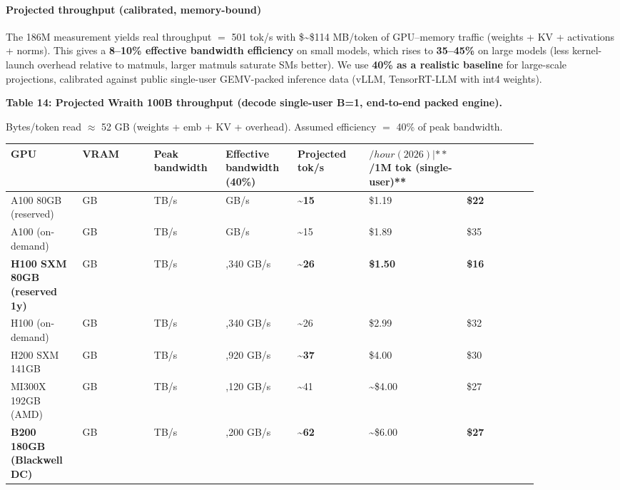 \paragraph{Projected throughput (calibrated,
memory-bound)}\label{projected-throughput-calibrated-memory-bound}

The 186M measurement yields real throughput \(=\) 501 tok/s with
\$\sim\$114 MB/token of GPU--memory traffic (weights + KV + activations
+ norms). This gives a \textbf{8--10\% effective bandwidth efficiency}
on small models, which rises to \textbf{35--45\%} on large models (less
kernel-launch overhead relative to matmuls, larger matmuls saturate SMs
better). We use \textbf{40\% as a realistic baseline} for large-scale
projections, calibrated against public single-user GEMV-packed inference
data (vLLM, TensorRT-LLM with int4 weights).

\textbf{Table 14: Projected Wraith 100B throughput (decode single-user
B=1, end-to-end packed engine).}

Bytes/token read \(\approx\) 52 GB (weights + emb + KV + overhead).
Assumed efficiency \(=\) 40\% of peak bandwidth.

{\def\LTcaptype{none} %
{\footnotesize\setlength{\tabcolsep}{3pt}
\begin{longtable}[]{@{}>{\raggedright\arraybackslash}p{0.123\linewidth}>{\raggedright\arraybackslash}p{0.123\linewidth}>{\raggedright\arraybackslash}p{0.123\linewidth}>{\raggedright\arraybackslash}p{0.123\linewidth}>{\raggedright\arraybackslash}p{0.123\linewidth}>{\raggedright\arraybackslash}p{0.123\linewidth}>{\raggedright\arraybackslash}p{0.123\linewidth}@{}}
\toprule\noalign{}
GPU & VRAM & Peak bandwidth & Effective bandwidth (40\%) & \textbf{Projected tok/s} & \(/hour (2026) | **\)/1M tok (single-user)** &  \\
\midrule\noalign{}
\endhead
\bottomrule\noalign{}
\endlastfoot
A100 80GB (reserved) & 80 GB & 2.0 TB/s & 800 GB/s &
\textbf{\textasciitilde15} & \$1.19 & \textbf{\$22} \\
A100 (on-demand) & 80 GB & 2.0 TB/s & 800 GB/s & \textasciitilde15 &
\$1.89 & \$35 \\
\textbf{H100 SXM 80GB (reserved 1y)} & 80 GB & 3.35 TB/s & 1,340 GB/s &
\textbf{\textasciitilde26} & \textbf{\$1.50} & \textbf{\$16} \\
H100 (on-demand) & 80 GB & 3.35 TB/s & 1,340 GB/s & \textasciitilde26 &
\$2.99 & \$32 \\
H200 SXM 141GB & 141 GB & 4.8 TB/s & 1,920 GB/s &
\textbf{\textasciitilde37} & \$4.00 & \$30 \\
MI300X 192GB (AMD) & 192 GB & 5.3 TB/s & 2,120 GB/s & \textasciitilde41
& \textasciitilde\$4.00 & \$27 \\
\textbf{B200 180GB (Blackwell DC)} & 180 GB & 8.0 TB/s & 3,200 GB/s &
\textbf{\textasciitilde62} & \textasciitilde\$6.00 & \textbf{\$27} \\
\end{longtable}
}
}

